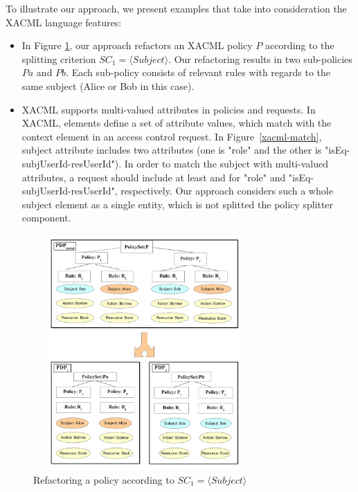 To illustrate our approach, we present examples that take into consideration the XACML language features:
\begin{itemize}
\item In Figure \ref{splitting}, our approach refactors an XACML policy $P$ according to the splitting criterion $SC_{1}=\langle Subject\rangle$. Our refactoring results in two sub-policies $Pa$ and $Pb$. Each sub-policy consists of relevant rules with regards to the same subject (Alice or Bob in this case).

\item
XACML supports multi-valued attributes in policies and requests. In XACML,  elements define a set of attribute values, which match with the context element in
an access control request. In Figure~\ref{xacml-match}, subject attribute includes two attributes (one is "role" and the other is "isEq-subjUserId-resUserId"). In order to match the subject with multi-valued attributes, a request should include at least  and  for "role" and "isEq-subjUserId-resUserId", respectively.
Our approach considers such a whole subject element as a single entity, which is not splitted the policy splitter component.




\end{itemize}
\begin{figure}[!h]
\begin{center}
\includegraphics[width=8.5cm, height=9cm]{splitting}
\caption{Refactoring a policy according to $SC_{1}=\langle Subject\rangle$}
\label{splitting}
\end{center}
\end{figure}


